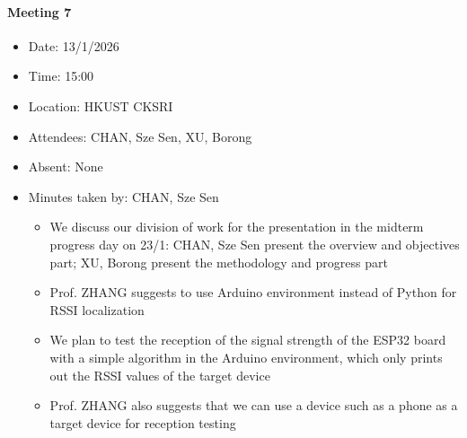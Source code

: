 \documentclass[11pt]{article}
\begin{document}
    \paragraph{Meeting 7}
    \begin{itemize}
        \item Date: 13/1/2026
        \item Time: 15:00
        \item Location: HKUST CKSRI
        \item Attendees: CHAN, Sze Sen, XU, Borong
        \item Absent: None
        \item Minutes taken by: CHAN, Sze Sen
        \begin{itemize}
            \item We discuss our division of work for the presentation in the midterm progress day on 23/1: CHAN, Sze Sen present the overview and objectives part; XU, Borong present the methodology and progress part
            \item Prof. ZHANG suggests to use Arduino environment instead of Python for RSSI localization 
            \item We plan to test the reception of the signal strength of the ESP32 board with a simple algorithm in the Arduino environment, which only prints out the RSSI values of the target device
            \item Prof. ZHANG also suggests that we can use a device such as a phone as a target device for reception testing
        \end{itemize}
    \end{itemize}
    
\end{document}
